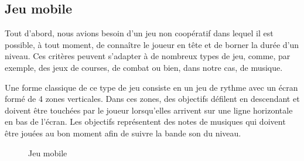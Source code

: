 \subsection{Jeu mobile}
Tout d'abord, nous avions besoin d'un jeu non coopératif dans lequel il est possible, à tout moment, de connaître le joueur en tête et de borner la durée d'un niveau. Ces critères peuvent s'adapter à de nombreux types de jeu, comme, par exemple, des jeux de courses, de combat ou bien, dans notre cas, de musique.

Une forme classique de ce type de jeu consiste en un jeu de rythme avec un écran formé de 4 zones verticales. Dans ces zones, des objectifs défilent en descendant et doivent être touchées par le joueur lorsqu'elles arrivent sur une ligne horizontale en bas de l'écran. Les objectifs représentent des notes de musiques qui doivent être jouées au bon moment afin de suivre la bande son du niveau.

\begin{figure}[h]
\begin{center}
\end{center}
\caption{Jeu mobile}
\end{figure}

